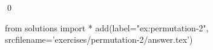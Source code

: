 
\begin{ex} 
  \label{ex:permutation-2}
  
  \qed
\end{ex} 
\begin{python0}
from solutions import *
add(label="ex:permutation-2",
    srcfilename='exercises/permutation-2/answer.tex') 
\end{python0}
